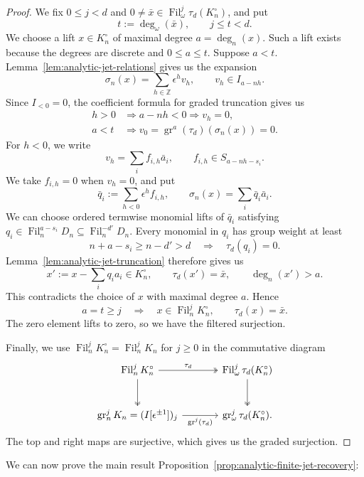 \documentclass[11pt]{article}
\theoremstyle{definition}
\newcommand{\gr}{\operatorname{gr}}
\newcommand{\Fil}{\operatorname{Fil}}
\begin{document}
\begin{proof}
We fix $0\leq j<d$ and
$0\neq\bar x\in\Fil_\omega^j\tau_d(K_n^\circ)$, and put
\[
 t:=\deg_\omega(\bar x),\qquad j\leq t<d.
\]
We choose a lift $x\in K_n^\circ$ of maximal degree $a=\deg_n(x)$.
Such a lift exists because the degrees are discrete and $0\leq a\leq t$.
Suppose $a<t$. Lemma~\ref{lem:analytic-jet-relations} gives us the expansion
\[
 \sigma_n(x)=\sum_{h\in\mathbb Z}\epsilon^h v_h,
 \qquad v_h\in I_{a-nh}.
\]
Since $I_{<0}=0$, the coefficient formula for graded truncation
gives us
\[
 \begin{aligned}
 h>0&\Rightarrow a-nh<0\Rightarrow v_h=0,\\
 a<t&\Rightarrow v_0=\gr^a(\tau_d)(\sigma_n(x))=0.
 \end{aligned}
\]
For $h<0$, we write
\[
 v_h=\sum_i f_{i,h}\bar a_i,
 \qquad f_{i,h}\in S_{a-nh-s_i}.
\]
We take $f_{i,h}=0$ when $v_h=0$, and put
\[
 \bar q_i:=\sum_{h<0}\epsilon^h f_{i,h},\qquad
 \sigma_n(x)=\sum_i\bar q_i\bar a_i.
\]
We can choose ordered termwise monomial lifts of $\bar{q}_i$ satisfying
$q_i\in\Fil_n^{a-s_i}D_n\subseteq\Fil_n^{-d'}D_n$.
Every monomial in $q_i$ has group weight at least
\[
 n+a-s_i\geq n-d'>d\quad\Rightarrow\quad\tau_d(q_i)=0.
\]
Lemma~\ref{lem:analytic-jet-truncation} therefore gives us
\[
 x':=x-\sum_iq_i a_i\in K_n^\circ,\qquad
 \tau_d(x')=\bar x,\qquad \deg_n(x')>a.
\]
This contradicts the choice of $x$ with maximal degree $a$. Hence
\[
 a=t\geq j\quad\Rightarrow\quad
 x\in\Fil_n^jK_n^\circ,\qquad\tau_d(x)=\bar x.
\]
The zero element lifts to zero, so we have the filtered surjection.

Finally, we use $\Fil_n^jK_n^\circ=\Fil_n^jK_n$ for $j\ge0$ in the
commutative diagram
\[
\begin{tikzcd}[column sep=large,row sep=large]
 \Fil_n^jK_n^\circ\arrow[r,two heads,"\tau_d"]\arrow[d,two heads]
 &\Fil_\omega^j\tau_d(K_n^\circ)\arrow[d,two heads]\\
 \gr_n^jK_n=(I[\epsilon^{\pm1}])_j
   \arrow[r,"\gr^j(\tau_d)"']
 &\gr_\omega^j\tau_d(K_n^\circ).
\end{tikzcd}
\]
The top and right maps are surjective, which gives us the graded surjection.
\end{proof}

We can now prove the main result Proposition~\ref{prop:analytic-finite-jet-recovery}:
\end{document}
